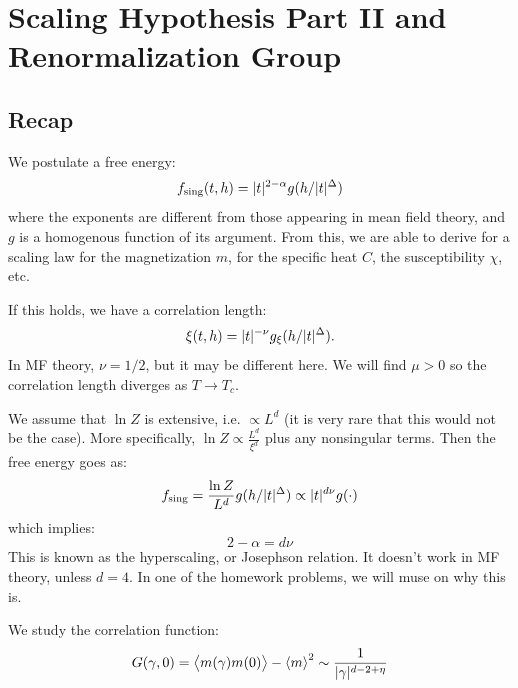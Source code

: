 \section{Scaling Hypothesis Part II and Renormalization Group}
\subsection{Recap}
We postulate a free energy:
\begin{equation}
    f_{\text{sing}}(t, h) = \lvert t \rvert^{2-\alpha}g(h/\lvert t \rvert^\Delta)
\end{equation}
where the exponents are different from those appearing in mean field theory, and $g$ is a homogenous function of its argument. From this, we are able to derive for a scaling law for the magnetization $m$, for the specific heat $C$, the susceptibility $\chi$, etc.

If this holds, we have a correlation length:
\begin{equation}
    \xi(t, h) = \lvert t \rvert^{-\nu}g_\xi(h/\lvert t \rvert^\Delta).
\end{equation}
In MF theory, $\nu = 1/2$, but it may be different here. We will find $\mu > 0$ so the correlation length diverges as $T \to T_c$.

We assume that $\ln Z$ is extensive, i.e. $\propto L^d$ (it is very rare that this would not be the case). More specifically, $\ln Z \propto \frac{L^d}{\xi^d}$ plus any nonsingular terms. Then the free energy goes as:
\begin{equation}\label{eq:singfreeenergy}
    f_{\text{sing}} = \frac{\ln Z}{L^d}g(h/\lvert t \rvert^\Delta) \propto \lvert t \rvert^{d\nu}g(\cdot)
\end{equation}
which implies:
\begin{equation}
    2-\alpha = d\nu
\end{equation}
This is known as the hyperscaling, or Josephson relation. It doesn't work in MF theory, unless $d = 4$. In one of the homework problems, we will muse on why this is.

We study the correlation function:
\begin{equation}
    G(\gamma, 0) = \left< m(\gamma)m(0) \right> - \left< m \right>^2 \sim \frac{1}{\lvert \gamma \rvert^{d-2+\eta}}
\end{equation}

